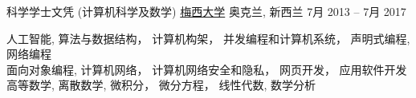

\begin{cventries}
	\cventry
	{科学学士文凭 (计算机科学及数学)}
	{\href{http://www.massey.ac.nz/}{梅西大学}}
	{奥克兰, \enskip 新西兰}
	{7月 2013 – 7月 2017}
	{
		\begin{cvitems}
		\item
			{人工智能},
			{算法与数据结构}，
			{计算机构架}，
			{并发编程和计算机系统}，
			{声明式编程},
			{网络编程}\\
			{面向对象编程},
			{计算机网络}，
			{计算机网络安全和隐私}，
			{网页开发}，
			{应用软件开发}\\
			{高等数学},
			{离散数学},
			{微积分}，
			{微分方程}，
			{线性代数},
			{数学分析}
		\end{cvitems}
	}
\end{cventries}


